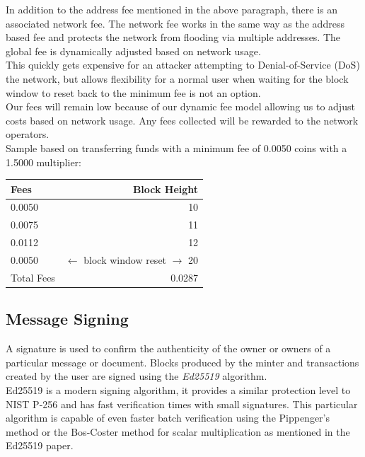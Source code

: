 \documentclass[12pt,a4paper]{article}
\begin{document}
  In addition to the address fee mentioned in the above paragraph, there is an
  associated  network fee. The network fee works in the same way as
  the address based fee and protects the network from flooding via multiple
  addresses. The global fee is dynamically adjusted based on network usage.\\

  This quickly gets expensive for an attacker attempting to Denial-of-Service
  (DoS) the network, but allows flexibility for a normal user when waiting for
  the block window to reset back to the minimum fee is not an option.\\

  Our fees will remain low because of our dynamic fee model allowing us to
  adjust costs based on network usage. Any fees collected will be rewarded to
  the network operators.\\

  \newpage
  Sample based on transferring funds with a minimum fee of 0.0050 coins with a
  1.5000 multiplier:

  \vspace{3mm}
  \begin{tabular}{@{}lr@{}}
    Fees & Block Height     \\ \toprule
    0.0050 & 10             \\
    0.0075 & 11             \\
    0.0112 & 12             \\
    0.0050 & $\leftarrow{}$ block window reset $\rightarrow{}$ 20 \\ \midrule{}
    Total Fees & 0.0287     \\
    \bottomrule
  \end{tabular}

  \subsection{Message Signing}
  A signature is used to confirm the authenticity of the owner or owners of a
  particular message or document. Blocks produced by the minter and transactions
  created by the user are signed using the \textit{Ed25519}\cite{ed25519}
  algorithm.\\

  Ed25519 is a modern signing algorithm, it provides a similar protection level
  to NIST P-256 and has fast verification times with small signatures. This
  particular algorithm is capable of even faster batch verification using the
  Pippenger's method or the Bos-Coster method for scalar multiplication as
  mentioned in the Ed25519 paper.\\
\end{document}
